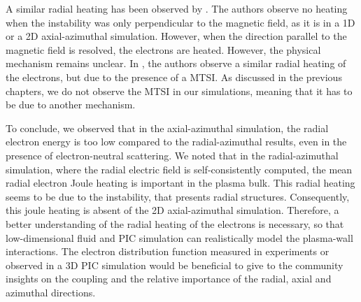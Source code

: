   A similar radial heating has been observed by \citet{heron2013}.
  The authors observe no heating when the instability was only perpendicular to the magnetic field, as it is in a \ac{1D} or a \ac{2D} axial-azimuthal simulation.
  However, when the direction parallel to the magnetic field is resolved, the electrons are heated.
  However, the physical mechanism remains unclear.
  In \citet{janhunen}, the authors observe a similar radial heating of the electrons, but due to the presence of a \ac{MTSI}.
  As discussed in the previous chapters, we do not observe the \ac{MTSI} in our simulations, meaning that it has to be due to another mechanism.

  \vspace{1em}
  To conclude, we observed that in the axial-azimuthal simulation, the radial electron energy is too low compared to the radial-azimuthal results, even in the presence of electron-neutral scattering.
  We noted that in the radial-azimuthal simulation, where the radial electric field is self-consistently computed, the mean radial electron Joule heating is important in the plasma bulk.
  This radial heating seems to be due to the instability, that presents radial structures.
  Consequently, this joule heating is absent of the \ac{2D} axial-azimuthal simulation.
  Therefore, a better understanding of the radial heating of the electrons is necessary, so that low-dimensional fluid and \ac{PIC} simulation can realistically model the plasma-wall interactions.
  The electron distribution function measured in experiments or observed in a \ac{3D} \ac{PIC} simulation would be beneficial to give to the community insights on the coupling and the relative importance of the radial, axial and azimuthal directions.



